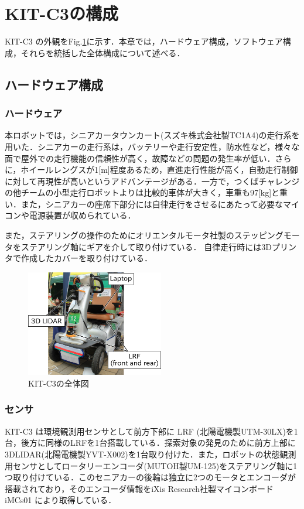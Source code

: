 \documentclass[10pt,a4paper]{jarticle}
\begin{document}
\section{KIT-C3の構成}
KIT-C3 の外観をFig.\ref{kitc3_robot}に示す．本章では，ハードウェア構成，ソフトウェア構成，それらを統括した全体構成について述べる．
\subsection{ハードウェア構成}
\subsubsection{ハードウェア}
本ロボットでは，シニアカータウンカート(スズキ株式会社製TC1A4)の走行系を用いた．シニアカーの走行系は，バッテリーや走行安定性，防水性など，様々な面で屋外での走行機能の信頼性が高く，故障などの問題の発生率が低い．さらに，ホイールレングスが1[m]程度あるため，直進走行性能が高く，自動走行制御に対して再現性が高いというアドバンテージがある．一方で，つくばチャレンジの他チームの小型走行ロボットよりは比較的車体が大きく，車重も97[kg]と重い．また，シニアカーの座席下部分には自律走行をさせるにあたって必要なマイコンや電源装置が収められている．

また，ステアリングの操作のためにオリエンタルモータ社製のステッピングモータをステアリング軸にギアを介して取り付けている．
自律走行時には3Dプリンタで作成したカバーを取り付けている．

\begin{figure}[bt]
 \centering
 \includegraphics[width=6cm]{./fig/png/thirdrobot_2016ver.png}
 \caption{KIT-C3の全体図}
  \label{kitc3_robot}
\end{figure}


\subsubsection{センサ}
KIT-C3 は環境観測用センサとして前方下部に LRF (北陽電機製UTM-30LX)を1台，後方に同様のLRFを1台搭載している．探索対象の発見のために前方上部に3DLIDAR(北陽電機製YVT-X002)を1台取り付けた．また，ロボットの状態観測用センサとしてロータリーエンコーダ(MUTOH製UM-125)をステアリング軸に1つ取り付けている．このセニアカーの後輪は独立に2つのモータとエンコーダが搭載されており，そのエンコーダ情報をiXis Research社製マイコンボード iMCs01 により取得している．
\end{document}
